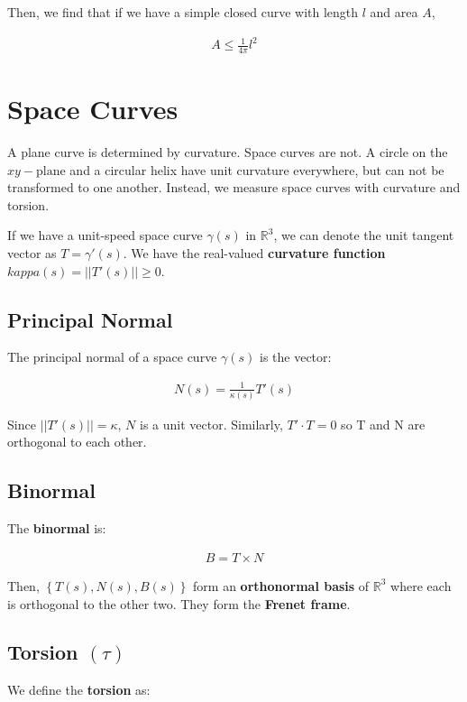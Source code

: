 \documentclass[11pt]{article}
\begin{document}
Then, we find that if we have a simple closed curve with length \(l\) and area \(A\),

\begin{align*}
    A \leq \frac{1}{4\pi}l^{2}
\end{align*}

\section{Space Curves}
\label{sec:org0b1af8b}
A plane curve is determined by curvature. Space curves are not. A circle on the \(xy-\text{plane}\) and a circular helix have unit curvature everywhere, but can not be transformed to one another. Instead, we measure space curves with curvature and torsion.

If we have a unit-speed space curve \(\gamma\left(s\right)\) in \(\mathbb{R}^{3}\), we can denote the unit tangent vector as \(T = \gamma'\left(s\right)\). We have the real-valued \textbf{curvature function} \(kappa\left(s\right) = \lvert\lvert T'\left(s\right) \lvert\lvert \geq 0\).

\subsection{Principal Normal}
\label{sec:org08ec088}
The principal normal of a space curve \(\gamma\left( s \right)\) is the vector:

\begin{align*}
    N\left( s \right) = \frac{1}{\kappa\left(s\right)}T'\left(s\right)
\end{align*}

Since \(\lvert\lvert T'\left(s\right) \lvert\lvert = \kappa\), \(N\) is a unit vector. Similarly, \(T' \cdot T = 0\) so T and N are orthogonal to each other.

\subsection{Binormal}
\label{sec:org647ef1e}
The \textbf{binormal} is:

\begin{align*}
    B = T \times N
\end{align*}

Then, \(\left\lbrace T\left(s\right), N\left(s\right), B\left(s\right) \right\rbrace\) form an \textbf{orthonormal basis} of \(\mathbb{R}^{3}\) where each is orthogonal to the other two. They form the \textbf{Frenet frame}.

\subsection{Torsion \(\left( \tau \right)\)}
\label{sec:org17cd0e5}
We define the \textbf{torsion} as:
\end{document}
